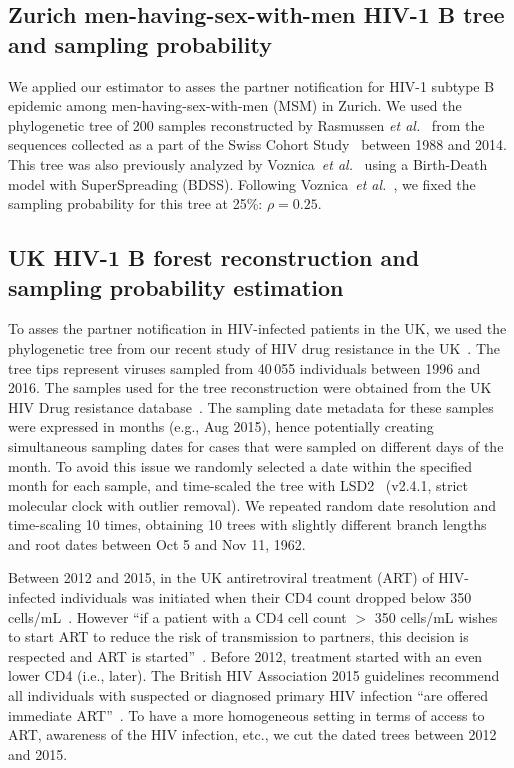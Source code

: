 \documentclass[10pt,letterpaper]{article}
\begin{document}
\subsection*{Zurich men-having-sex-with-men HIV-1 B tree and sampling probability}\label{zurich_tree}
We applied our estimator to asses the partner notification for HIV-1 subtype B epidemic among men-having-sex-with-men (MSM) in Zurich.  We used the phylogenetic tree of 200 samples reconstructed by Rasmussen \textit{et al.}~\cite{Rasmussen2017} from the sequences collected as a part of the Swiss Cohort Study~\cite{swisshivcohortstudyCohortProfileSwiss2010a} between 1988 and 2014. This tree was also previously analyzed by Voznica~\textit{et al.}~\cite{Voznica2021} using a Birth-Death model with SuperSpreading (BDSS). Following Voznica~\textit{et al.}~\cite{Voznica2021}, we fixed the sampling probability for this tree at 25\%: $\rho=0.25$.

\subsection*{UK HIV-1 B forest reconstruction and sampling probability estimation}\label{uk_tree}
To asses the partner notification in HIV-infected patients in the UK, we used the phylogenetic tree from our recent study of HIV drug resistance in the UK~\cite{zhukovaModelingDrugResistance2023}. The tree tips represent viruses sampled from 40\,055 individuals between 1996 and 2016. The samples used for the tree reconstruction were obtained from the UK HIV Drug resistance database~\cite{Dunn2007}. The sampling date metadata for these samples were expressed in months (e.g., Aug 2015), hence potentially creating simultaneous sampling dates for cases that were sampled on different days of the month. To avoid this issue we randomly selected a date within the specified month for each sample, and time-scaled the tree with LSD2~\cite{To2016} (v2.4.1, strict molecular clock with outlier removal). We repeated random date resolution and time-scaling 10 times, obtaining 10 trees with slightly different branch lengths and root dates between Oct 5 and Nov 11, 1962.

Between 2012 and 2015, in the UK antiretroviral treatment (ART) of HIV-infected individuals  was initiated when their CD4 count dropped below 350 cells/mL~\cite{williamsBritishHIVAssociation2012}. However ``if a patient with a CD4 cell count $>$ 350 cells/mL wishes to start ART to reduce the risk of transmission to partners, this decision is respected and ART is started''~\cite{williamsBritishHIVAssociation2012}. Before 2012, treatment started with an even lower CD4 (i.e., later). The British HIV Association 2015 guidelines recommend all individuals with suspected or diagnosed primary HIV infection ``are offered immediate ART''~\cite{churchillBritishHIVAssociation2016}. To have a more homogeneous setting in terms of access to ART, awareness of the HIV infection, etc., we cut the dated trees between 2012 and 2015. 
\end{document}
